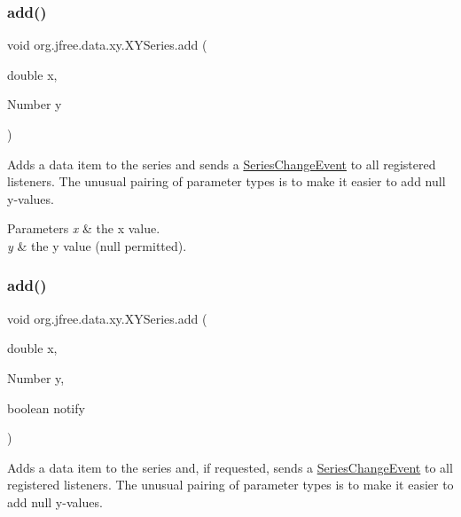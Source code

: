 \subsubsection{\texorpdfstring{add()}{add()}\hspace{0.1cm}{\footnotesize\ttfamily [4/8]}}
{\footnotesize\ttfamily void org.\+jfree.\+data.\+xy.\+X\+Y\+Series.\+add (\begin{DoxyParamCaption}\item[{double}]{x,  }\item[{Number}]{y }\end{DoxyParamCaption})}

Adds a data item to the series and sends a \mbox{\hyperlink{}{Series\+Change\+Event}} to all registered listeners. The unusual pairing of parameter types is to make it easier to add {\ttfamily null} y-\/values.


\begin{DoxyParams}{Parameters}
{\em x} & the x value. \\
\hline
{\em y} & the y value ({\ttfamily null} permitted). \\
\hline
\end{DoxyParams}
\mbox{\label{classorg_1_1jfree_1_1data_1_1xy_1_1_x_y_series_a967850009f78ba888f4c271674d04b0b}} 
\subsubsection{\texorpdfstring{add()}{add()}\hspace{0.1cm}{\footnotesize\ttfamily [5/8]}}
{\footnotesize\ttfamily void org.\+jfree.\+data.\+xy.\+X\+Y\+Series.\+add (\begin{DoxyParamCaption}\item[{double}]{x,  }\item[{Number}]{y,  }\item[{boolean}]{notify }\end{DoxyParamCaption})}

Adds a data item to the series and, if requested, sends a \mbox{\hyperlink{}{Series\+Change\+Event}} to all registered listeners. The unusual pairing of parameter types is to make it easier to add null y-\/values.


